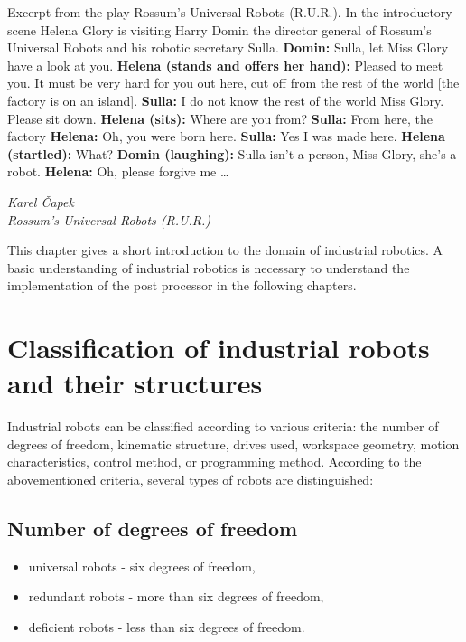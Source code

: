 \epigraph{

Excerpt from the play Rossum’s Universal Robots (R.U.R.).\break
In the introductory scene Helena Glory is visiting Harry Domin the director general of Rossum’s Universal Robots and his robotic secretary Sulla.\break
\break
\textbf{Domin:} Sulla, let Miss Glory have a look at you.\break
\textbf{Helena (stands and offers her hand):} Pleased to meet you. It must be very hard for you out here, cut off from the rest of the world [the factory is on an island].\break
\textbf{Sulla:} I do not know the rest of the world Miss Glory. Please sit down.\break
\textbf{Helena (sits):} Where are you from?\break
\textbf{Sulla:} From here, the factory\break
\textbf{Helena:} Oh, you were born here.\break
\textbf{Sulla:} Yes I was made here.\break
\textbf{Helena (startled):} What?\break
\textbf{Domin (laughing):} Sulla isn’t a person, Miss Glory, she’s a robot.\break
\textbf{Helena:} Oh, please forgive me …
}{\textit{Karel Čapek \\ Rossum’s Universal Robots (R.U.R.)}}

This chapter gives a short introduction to the domain of industrial robotics. A basic understanding of industrial robotics is necessary to understand the implementation of the post processor in the following chapters.

\section{Classification of industrial robots and their structures}

Industrial robots can be classified according to various criteria: the number of degrees of freedom, kinematic structure, drives used, workspace geometry, motion characteristics, control method, or programming method. According to the abovementioned criteria, several types of robots are distinguished:

\subsection*{Number of degrees of freedom}

\begin{itemize}
    \item universal robots - six degrees of freedom,
    \item redundant robots - more than six degrees of freedom,
    \item deficient robots - less than six degrees of freedom.
\end{itemize}


